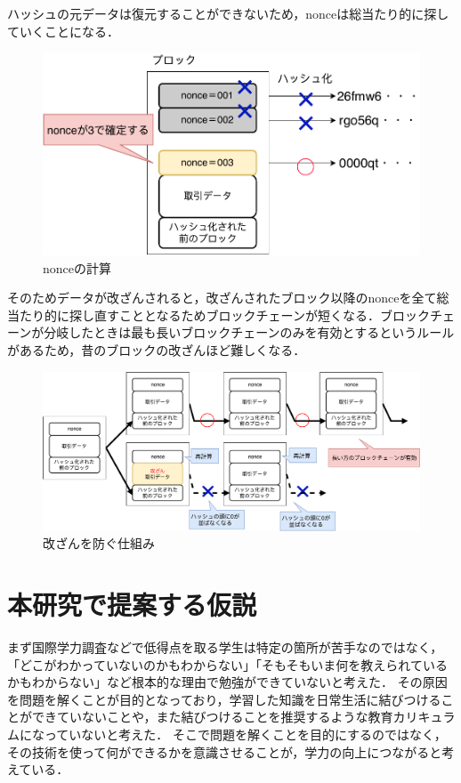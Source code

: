 \documentclass[a4j,12pt]{jsarticle}
\begin{document}
ハッシュの元データは復元することができないため，nonceは総当たり的に探していくことになる．

\begin{figure}[H]
\centering
\includegraphics[width=14cm]{nonce.pdf}
\caption{nonceの計算}
\label{fig:no}
\end{figure} 

そのためデータが改ざんされると，改ざんされたブロック以降のnonceを全て総当たり的に探し直すこととなるためブロックチェーンが短くなる．ブロックチェーンが分岐したときは最も長いブロックチェーンのみを有効とするというルールがあるため，昔のブロックの改ざんほど難しくなる．

\begin{figure}[H]
\centering
\includegraphics[width=14cm]{blockk.pdf}
\caption{改ざんを防ぐ仕組み}
\label{fig:no}
\end{figure} 

\newpage
\section{本研究で提案する仮説}
まず国際学力調査などで低得点を取る学生は特定の箇所が苦手なのではなく，「どこがわかっていないのかもわからない」「そもそもいま何を教えられているかもわからない」など根本的な理由で勉強ができていないと考えた．
その原因を問題を解くことが目的となっており，学習した知識を日常生活に結びつけることができていないことや，また結びつけることを推奨するような教育カリキュラムになっていないと考えた．
そこで問題を解くことを目的にするのではなく，その技術を使って何ができるかを意識させることが，学力の向上につながると考えている．
\end{document}
